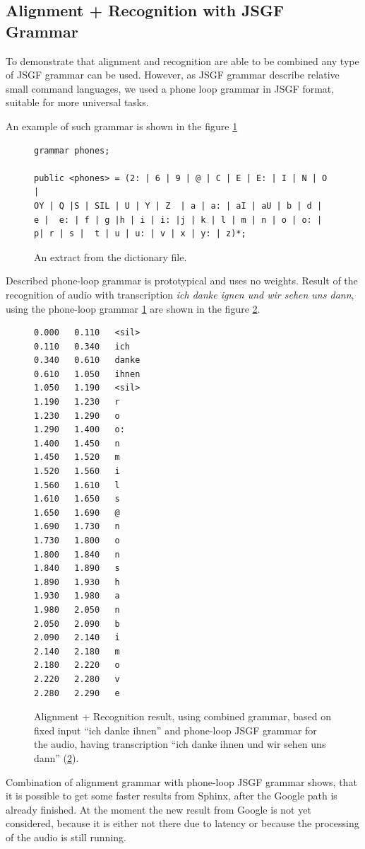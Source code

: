 \subsection {Alignment + Recognition with JSGF Grammar}
To demonstrate that alignment and recognition are able to be combined any
type of JSGF grammar can be used. However, as JSGF grammar describe 
relative small command languages, we used a phone loop grammar in JSGF format,
suitable for more universal tasks.

An example of such grammar is shown in the figure   \ref{fig:phone_loop}

\begin{figure}[htbp]
\lstset{language=XML} 
%  
%  
\begin{lstlisting}[frame=single]
grammar phones;

public <phones> = (2: | 6 | 9 | @ | C | E | E: | I | N | O |
OY | Q |S | SIL | U | Y | Z  | a | a: | aI | aU | b | d |
e |  e: | f | g |h | i | i: |j | k | l | m | n | o | o: |
p| r | s |  t | u | u: | v | x | y: | z)*;
\end{lstlisting}
 \caption{An extract from the dictionary file.}
  \label{fig:phone_loop}
\end {figure}

Described phone-loop grammar is prototypical and uses no weights. Result of the
recognition of audio with transcription \textit {ich danke ignen und wir sehen
uns dann}, using the phone-loop grammar   \ref{fig:phone_loop} are shown in the
figure \ref{fig:phone_loop_res}.
\begin{figure}[htbp]
 \centering 
\begin{center}
\begin{lstlisting}[frame=single]
0.000	0.110	<sil>
0.110	0.340	ich
0.340	0.610	danke
0.610	1.050	ihnen
1.050	1.190	<sil>
1.190	1.230	r
1.230	1.290	o
1.290	1.400	o:
1.400	1.450	n
1.450	1.520	m
1.520	1.560	i
1.560	1.610	l
1.610	1.650	s
1.650	1.690	@
1.690	1.730	n
1.730	1.800	o
1.800	1.840	n
1.840	1.890	s
1.890	1.930	h
1.930	1.980	a
1.980	2.050	n
2.050	2.090	b
2.090	2.140	i
2.140	2.180	m
2.180	2.220	o
2.220	2.280	v
2.280	2.290	e
\end{lstlisting}
\end{center}
 \caption{Alignment + Recognition result, using combined grammar, based on
 fixed input ``ich danke ihnen'' and phone-loop JSGF grammar for the audio,
 having transcription ``ich danke ihnen und wir sehen uns dann''
 (\ref{fig:phone_loop_res}).}
  \label{fig:phone_loop_res}
\end {figure}
Combination of alignment grammar with phone-loop JSGF grammar shows, that it is
possible to get some faster results from Sphinx, after the Google path is
already finished. At the moment the new result from Google is not yet
considered, because it is either not there due to latency or because the
processing of the audio is still running. 

